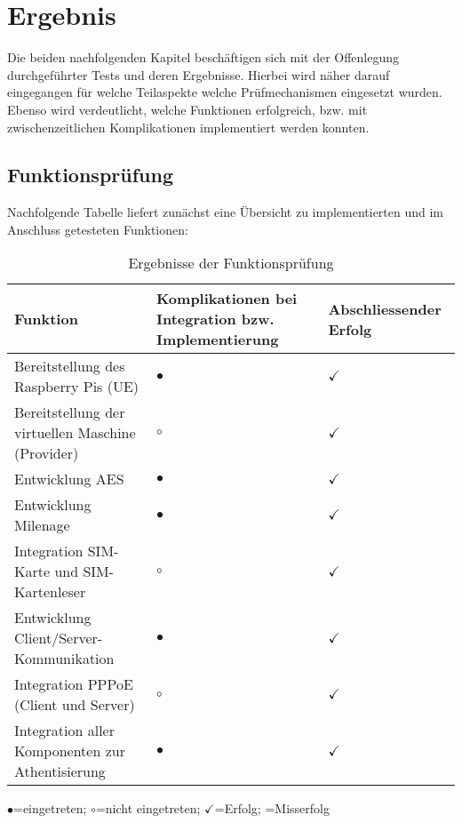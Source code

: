 \section{Ergebnis}
	Die beiden nachfolgenden Kapitel beschäftigen sich mit der Offenlegung durchgeführter Tests und deren Ergebnisse.
	Hierbei wird näher darauf eingegangen für welche Teilaspekte welche Prüfmechanismen
	eingesetzt wurden. Ebenso wird verdeutlicht, welche Funktionen erfolgreich, bzw.
	mit zwischenzeitlichen Komplikationen implementiert werden konnten.

	\subsection{Funktionsprüfung}
	\label{ergebnis-tests}
	Nachfolgende Tabelle liefert zunächst eine Übersicht zu implementierten und im Anschluss
	getesteten Funktionen:\vspace*{5mm}

	\begin{table}[h]
	\begin{tabularx}{\textwidth}{|X||X|X|}
    \hline
      \textbf{Funktion} & \textbf{Komplikationen bei Integration bzw. Implementierung} & \textbf{Abschliessender Erfolg} \\
    \hline
    \hline
     	Bereitstellung des Raspberry Pis (UE) & $\bullet$ & $\checkmark$ \\
    \hline
    \hline
     	Bereitstellung der virtuellen Maschine (Provider) & $\circ$ & $\checkmark$ \\
    \hline
    \hline
     	Entwicklung AES & $\bullet$ & $\checkmark$ \\
    \hline
    \hline
    	Entwicklung Milenage & $\bullet$ & $\checkmark$ \\
    \hline
    \hline
    	Integration SIM-Karte und SIM-Kartenleser & $\circ$ & $\checkmark$ \\
    \hline
    \hline
    	Entwicklung Client/Server-Kommunikation & $\bullet$ & $\checkmark$ \\
    \hline
    \hline
    	Integration PPPoE (Client und Server) & $\circ$ & $\checkmark$ \\
    \hline
    \hline
    	Integration aller Komponenten zur Athentisierung & $\bullet$ & $\checkmark$ \\
    \hline
    \end{tabularx}
    \caption{Ergebnisse der Funktionsprüfung}
    \end{table}

    \centerline{$\bullet$=eingetreten; $\circ$=nicht eingetreten; $\checkmark$=Erfolg; =Misserfolg}\vspace*{5mm}

